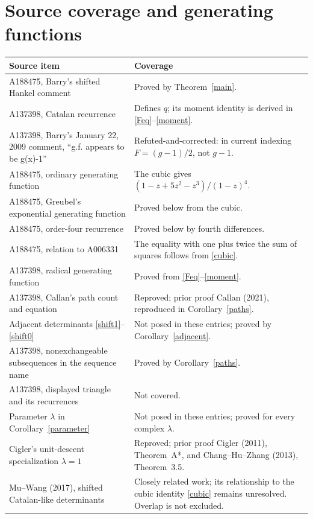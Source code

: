 \documentclass[11pt]{article}
\begin{document}
\section{Source coverage and generating functions}
\begin{center}\small
\begin{tabular}{@{}p{.43\linewidth}p{.47\linewidth}@{}}
\toprule
Source item & Coverage\\\midrule
A188475, Barry's shifted Hankel comment & Proved by Theorem~\ref{main}.\\
A137398, Catalan recurrence & Defines $q$; its moment identity is derived in
\eqref{Feq}--\eqref{moment}.\\
A137398, Barry's January 22, 2009 comment, ``g.f. appears to be g(x)-1''
& Refuted-and-corrected: in current indexing $F=(g-1)/2$, not $g-1$.\\
A188475, ordinary generating function & The cubic gives
$(1-z+5z^2-z^3)/(1-z)^4$.\\
A188475, Greubel's exponential generating function & Proved below from
the cubic.\\
A188475, order-four recurrence & Proved below by fourth differences.\\
A188475, relation to A006331 & The equality with one plus twice the
sum of squares follows from \eqref{cubic}.\\
A137398, radical generating function & Proved from
\eqref{Feq}--\eqref{moment}.\\
A137398, Callan's path count and equation & Reproved; prior proof
Callan (2021), reproduced in Corollary~\ref{paths}.\\
Adjacent determinants \eqref{shift1}--\eqref{shift0} & Not posed in these
entries; proved by Corollary~\ref{adjacent}.\\
A137398, nonexchangeable subsequences in the sequence name & Proved by
Corollary~\ref{paths}.\\
A137398, displayed triangle and its recurrences & Not covered.\\
Parameter $\lambda$ in Corollary~\ref{parameter} & Not posed in these
entries; proved for every complex $\lambda$.\\
Cigler's unit-descent specialization $\lambda=1$ & Reproved; prior
proof Cigler (2011), Theorem~A*, and Chang--Hu--Zhang (2013), Theorem~3.5.\\
Mu--Wang (2017), shifted Catalan-like determinants \cite{mu-wang}
& Closely related work; its relationship to the cubic identity
\eqref{cubic} remains unresolved. Overlap is not excluded.\\
\bottomrule
\end{tabular}
\end{center}
\end{document}
